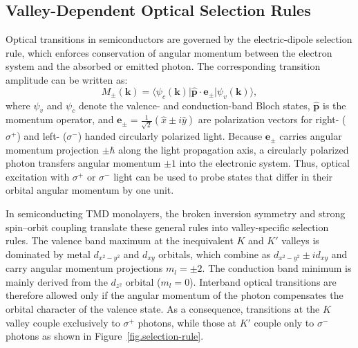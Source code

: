 \subsection{Valley-Dependent Optical Selection Rules}
Optical transitions in semiconductors are governed by the electric-dipole selection rule, 
which enforces conservation of angular momentum between the electron system and the absorbed or emitted photon\cite{Yu2010-yp,Fox2010-ly}. 
The corresponding transition amplitude can be written as\cite{Fox2010-ly}:
\begin{equation}
M_{\pm}(\mathbf{k}) = \big\langle \psi_{c}(\mathbf{k}) \big| 
\hat{\mathbf{p}} \cdot \mathbf{e}_{\pm} 
\big| \psi_{v}(\mathbf{k}) \big\rangle,
\label{eq.OP transition}
\end{equation}
where $\psi_{v}$ and $\psi_{c}$ denote the valence- and conduction-band Bloch states,
$\hat{\mathbf{p}}$ is the momentum operator, and
$\mathbf{e}_{\pm} =\frac{1}{\sqrt{2}} (\hat{x} \pm i\hat{y})$ are polarization vectors for right- ($\sigma^{+}$) and left- ($\sigma^{-}$) handed circularly polarized light\cite{Teich1991-lv}.
Because $\mathbf{e}_{\pm}$ carries angular momentum projection $\pm \hbar$ along the light propagation axis, a circularly polarized photon transfers angular momentum $\pm 1$ into the electronic system\cite{Fox2010-ly}. 
Thus, optical excitation with $\sigma^+$ or $\sigma^-$ light can
be used to probe states that differ in their orbital angular momentum by one unit\cite{Cao2012-tt,Xiao2012-pw,Mak2012-le}.

In semiconducting TMD monolayers, the broken inversion symmetry and strong spin--orbit coupling translate these general rules into valley-specific selection rules\cite{Xiao2012-pw}. 
The valence band maximum at the inequivalent $K$ and $K'$ valleys is dominated by metal $d_{x^2-y^2}$ and $d_{xy}$ orbitals, which combine as $d_{x^2-y^2} \pm i d_{xy}$ and carry angular momentum projections $m_l = \pm 2$.
The conduction band minimum is mainly derived from the $d_{z^2}$ orbital ($m_l=0$)\cite{Liu2013-jh}. 
Interband optical transitions are therefore allowed only if the angular momentum of the photon compensates the orbital character of the valence state. 
As a consequence, transitions at the $K$ valley couple exclusively to $\sigma^+$ photons, while those at $K'$ couple only to $\sigma^-$ photons as shown in Figure~\ref{fig.selection-rule}.

